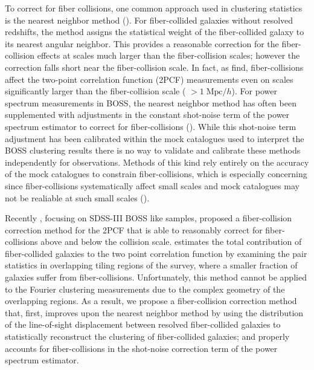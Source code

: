 \documentclass{emulateapj}
\begin{document}
To correct for fiber collisions, one common approach used in clustering statistics is the nearest neighbor method (\citealt{Zehavi:2002aa, Berlind:2006aa, Anderson:2012aa}). For fiber-collided galaxies without resolved redshifts, the method assigns the statistical weight of the fiber-collided galaxy to its nearest angular neighbor. This provides a reasonable correction for the fiber-collision effects at scales much larger than the fiber-collision scales; however the correction falls short near the fiber-collision scale. In fact, as \cite{Zehavi:2005aa} find, fiber-collisions affect the two-point correlation function (2PCF) measurements even on scales significantly larger than the fiber-collision scale ( $> 1\;\mathrm{Mpc}/h$). For power spectrum measurements in BOSS, the nearest neighbor method has often been supplemented with adjustments in the constant shot-noise term of the power spectrum estimator to correct for fiber-collisions (\citealt{Beutler:2014aa, Gil-Marin:2014aa}). While this shot-noise term adjustment has been calibrated within the mock catalogues used to interpret the BOSS clustering results there is no way to validate and calibrate these methods independently for observations. Methods of this kind rely entirely on the accuracy of the mock catalogues to constrain fiber-collisions, which is especially concerning since fiber-collisions systematically affect small scales and mock catalogues may not be realiable at such small scales (\citealt{Heitmann:2008aa, Schneider:2015aa}). 

Recently \cite{Guo:2012aa}, focusing on SDSS-III BOSS like samples, proposed a fiber-collision correction method for the 2PCF that is able to reasonably correct for fiber-collisions above and below the collision scale. \cite{Guo:2012aa} estimates the total contribution of fiber-collided galaxies to the two point correlation function by examining the pair statistics in overlapping tiling regions of the survey, where a smaller fraction of galaxies suffer from fiber-collisions. Unfortunately, this method cannot be applied to the Fourier clustering measurements due to the complex geometry of the overlapping regions. As a result, we propose a fiber-collision correction method that, first, improves upon the nearest neighbor method by using the distribution of the line-of-sight displacement between resolved fiber-collided galaxies to statistically reconstruct the clustering of fiber-collided galaxies; and properly accounts for fiber-collisions in the shot-noise correction term of the power spectrum estimator. 
\end{document}
